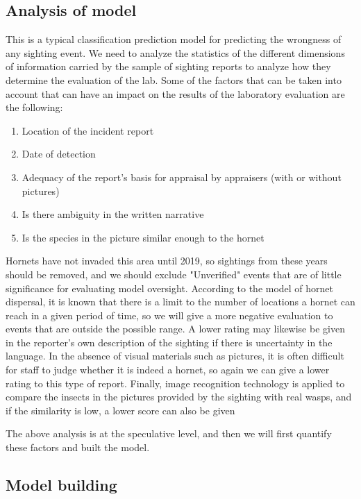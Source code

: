\documentclass{mcmthesis}
\begin{document}
\subsection{Analysis of model}

This is a typical classification prediction model for predicting the wrongness of any sighting event. We need to analyze the statistics of the different dimensions of information carried by the sample of sighting reports to analyze how they determine the evaluation of the lab. Some of the factors that can be taken into account that can have an impact on the results of the laboratory evaluation are the following:

\begin{enumerate}
    \item Location of the incident report
    \item Date of detection
    \item Adequacy of the report's basis for appraisal by appraisers (with or without pictures)
    \item Is there ambiguity in the written narrative
    \item Is the species in the picture similar enough to the hornet
\end{enumerate}

Hornets have not invaded this area until 2019, so sightings from these years should be removed, and we should exclude "Unverified" events that are of little significance for evaluating model oversight. According to the model of hornet dispersal, it is known that there is a limit to the number of locations a hornet can reach in a given period of time, so we will give a more negative evaluation to events that are outside the possible range. A lower rating may likewise be given in the reporter's own description of the sighting if there is uncertainty in the language. In the absence of visual materials such as pictures, it is often difficult for staff to judge whether it is indeed a hornet, so again we can give a lower rating to this type of report. Finally, image recognition technology is applied to compare the insects in the pictures provided by the sighting with real wasps, and if the similarity is low, a lower score can also be given

The above analysis is at the speculative level, and then we will first quantify these factors and built the model.

\subsection{Model building}
\end{document}
